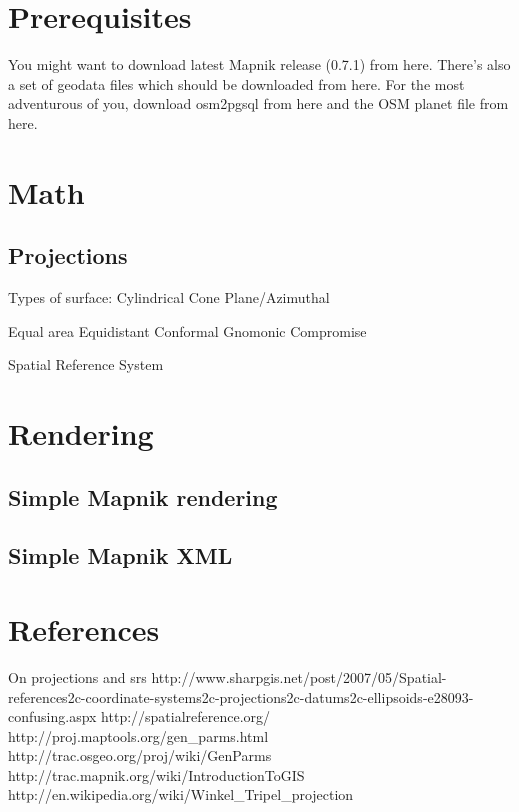 \documentclass{article}
\begin{document}
\section{Prerequisites}

You might want to download latest Mapnik release (0.7.1) from here.
There's also a set of geodata files which should be downloaded from here.
For the most adventurous of you, download osm2pgsql from here and the OSM planet file from here.

\section{Math}

\subsection{Projections}

Types of surface:
Cylindrical
Cone
Plane/Azimuthal

Equal area
Equidistant
Conformal
Gnomonic
Compromise

Spatial Reference System


\section{Rendering}

\subsection{Simple Mapnik rendering}



\subsection{Simple Mapnik XML}

\section{References}

On projections and srs
http://www.sharpgis.net/post/2007/05/Spatial-references2c-coordinate-systems2c-projections2c-datums2c-ellipsoids-e28093-confusing.aspx
http://spatialreference.org/
http://proj.maptools.org/gen_parms.html
http://trac.osgeo.org/proj/wiki/GenParms
http://trac.mapnik.org/wiki/IntroductionToGIS
http://en.wikipedia.org/wiki/Winkel_Tripel_projection
\end{document}
